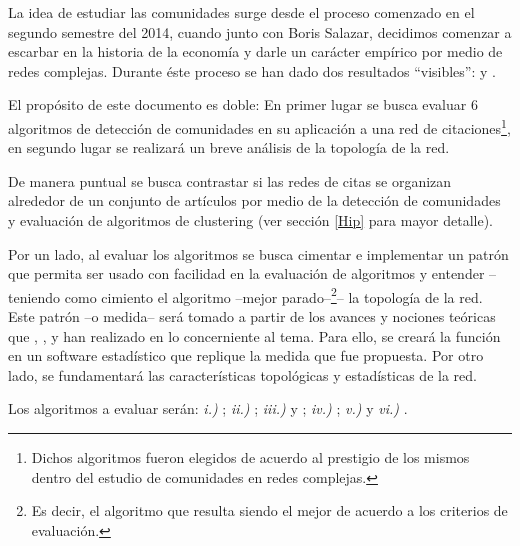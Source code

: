 \documentclass[12pt,letter]{article}
\begin{document}
La idea de estudiar las comunidades surge desde el proceso comenzado en el segundo semestre del 2014, cuando junto con Boris Salazar, decidimos comenzar a escarbar en la historia de la economía y darle un carácter empírico por medio de redes complejas. Durante éste proceso se han dado dos resultados ``visibles'': \citet{Salazar1} y \citet{Salazar2}.

\vspace{0.5cm}

El propósito de este documento es doble: En primer lugar se busca evaluar 6 algoritmos de detección de comunidades en su aplicación a una red de citaciones\footnote{Dichos algoritmos fueron elegidos de acuerdo al prestigio de los mismos dentro del estudio de comunidades en redes complejas.}, en segundo lugar se realizará un breve análisis de la topología de la red.

\vspace{0.5cm}
De manera puntual se busca contrastar si las redes de citas se organizan alrededor de un conjunto de artículos por medio de la detección de comunidades y evaluación de algoritmos de clustering (ver sección \ref{Hip} para mayor detalle).
\vspace{0.5cm}

Por un lado, al evaluar los algoritmos se busca cimentar e implementar un patrón que permita ser usado con facilidad en la evaluación de algoritmos y entender --teniendo como cimiento el algoritmo --mejor parado--\footnote{Es decir, el algoritmo que resulta siendo el mejor de acuerdo a los criterios de evaluación.}-- la topología de la red. Este patrón --o medida-- será tomado a partir de los avances y nociones teóricas que \cite{Labatut}, \cite{Leskovec1}, \cite{Leskovec2} y  \citet{Yang} han realizado en lo concerniente al tema. Para ello, se creará la función en un software estadístico que replique la medida que fue propuesta. Por otro lado, se fundamentará las características topológicas y estadísticas de la red.

\vspace{0.5cm}

Los algoritmos a evaluar serán: \emph{i.)} \cite{Blondel}; \emph{ii.)} \cite{Clauset}; \emph{iii.)} \cite{Girvan1} y \cite{Girvan2}; \emph{iv.)} \cite{Pons}; \emph{v.)} \cite{Raghavan} y \emph{vi.)} \cite{Rosvall1}.

\vspace{0.5cm}
\end{document}
